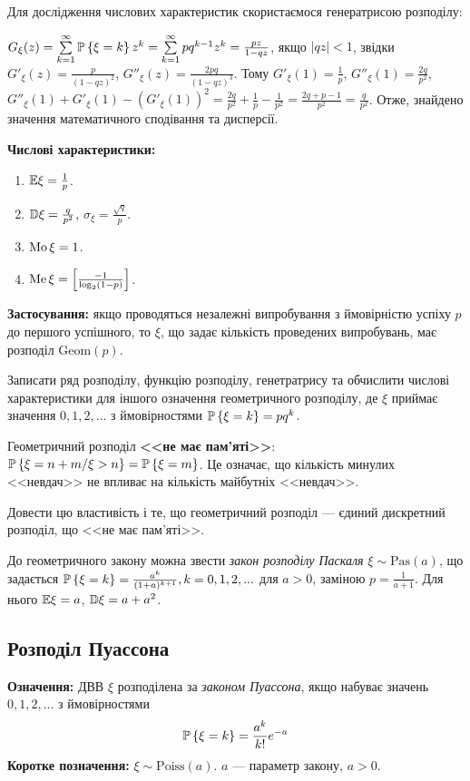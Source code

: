 Для дослідження числових характеристик скористаємося генератрисою розподілу:

$G_\xi(z) = \sum\limits_{k=1}^{\infty} \P\left\{\xi = k\right\} z^k = \sum\limits_{k=1}^{\infty} pq^{k-1} z^k = \frac{pz}{1-qz}$, якщо $\left| qz\right|<1$, звідки
$G'_\xi(z) = \frac{p}{(1-qz)^2}$, $G''_\xi(z) = \frac{2pq}{(1-qz)^3}$. Тому
$G'_\xi(1) = \frac{1}{p}$, $G''_\xi(1) = \frac{2q}{p^2}$, $G''_\xi(1) + G'_\xi(1) - \left( G'_\xi(1)\right)^2 = \frac{2q}{p^2} + \frac{1}{p} - \frac{1}{p^2} = \frac{2q+p-1}{p^2} = \frac{q}{p^2}$.
Отже, знайдено значення математичного сподівання та дисперсії.

\noindent\textbf{Числові характеристики:}
\begin{enumerate}
    \item $\E\xi = \frac{1}{p}$.
    \item $\D\xi = \frac{q}{p^2}$, $\sigma_\xi = \frac{\sqrt{q}}{p}$.
    \item $\Mo\xi = 1$.
    \item $\Me\xi = \left[ \frac{-1}{\log_2(1-p)}\right]$.
\end{enumerate}

\noindent\textbf{Застосування:} якщо проводяться незалежні випробування з ймовірністю успіху $p$ до першого успішного,
    то $\xi$, що задає кількість проведених випробувань, має розподіл $\mathrm{Geom}(p)$.

\begin{exercise}
    Записати ряд розподілу, функцію розподілу, генетратрису та обчислити
    числові характеристики для іншого означення геометричного розподілу, 
    де $\xi$ приймає значення $0,1,2,...$ з ймовірностями $\P\left\{\xi = k\right\} = pq^k$.
\end{exercise}
Геометричний розподіл \textbf{<<не має пам'яті>>}: $\P\left\{\xi = n+m / \xi > n\right\} = \P\left\{\xi = m\right\}$.
Це означає, що кількість минулих <<невдач>> не впливає на кількість майбутніх <<невдач>>.
\begin{exercise}
    Довести цю властивість і те, що геометричний розподіл --- 
    єдиний дискретний розподіл, що <<не має пам'яті>>.
\end{exercise}
До геометричного закону можна звести \emph{закон розподілу Паскаля} $\xi \sim \mathrm{Pas}(a)$,
що задається $\P\left\{\xi = k\right\} = \frac{a^k}{(1+a)^{k+1}}, k = 0,1,2,...$ для $a>0$,
заміною $p=\frac{1}{a+1}$. Для нього $\E\xi = a$, $\D\xi = a + a^2$.

\subsection{Розподіл Пуассона}
\noindent\textbf{Означення:}
    ДВВ $\xi$ розподілена за \emph{законом Пуассона}, 
    якщо набуває значень $0,1,2,...$ з ймовірностями \begin{equation}
        \P\left\{\xi = k\right\} = \frac{a^k}{k!}e^{-a}
    \end{equation}
    \textbf{Коротке позначення:} $\xi \sim \mathrm{Poiss}(a)$.
    $a$ --- параметр закону, $a > 0$.

